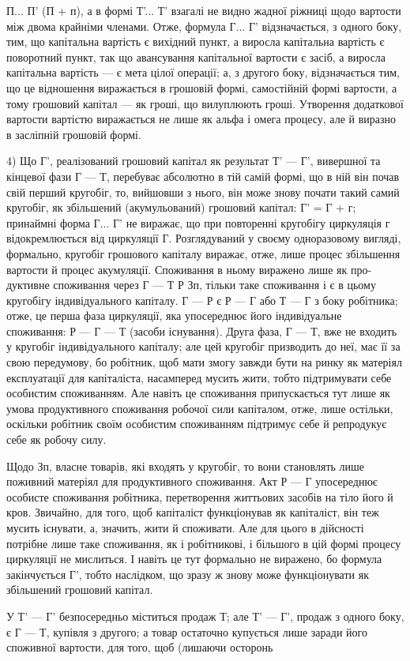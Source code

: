 \parcont{}  %
П... П' (П + п), а в формі Т'... Т' взагалі не видно жадної ріжниці щодо
вартости між двома крайніми членами. Отже, формула Г... Г’ відзначається,
з одного боку, тим, що капітальна вартість є вихідний пункт, а виросла
капітальна вартість є поворотний пункт, так що авансування
капітальної вартости є засіб, а виросла капітальна вартість — є мета
цілої операції; а, з другого боку, відзначається тим, що це відношення
виражається в грошовій формі, самостійній формі вартости, а тому грошовий
капітал — як гроші, що вилуплюють гроші. Утворення додаткової
вартости вартістю виражається не лише як альфа і омега процесу,
але й виразно в засліпній грошовій формі.

4) Що Г', реалізований грошовий капітал як результат Т' — Г', вивершної
та кінцевої фази Г — Т, перебуває абсолютно в тій самій формі, що в
ній він почав свій перший кругобіг, то, вийшовши з нього, він може
знову почати такий самий кругобіг, як збільшений (акумульований)
грошовий капітал: Г' = Г + г; принаймні форма Г... Г' не виражає, що
при повторенні кругобігу циркуляція г відокремлюється від циркуляції Г.
Розглядуваний у своєму одноразовому вигляді, формально, кругобіг
грошового капіталу виражає, отже, лише процес збільшення вартости й
процес акумуляції. Споживання в ньому виражено лише як про-дуктивне споживання через Г — Т  Р Зп,
тільки таке споживання
і є в цьому кругобігу індивідуального капіталу. Г — Р є Р — Г або Т — Г
з боку робітника; отже, це перша фаза циркуляції, яка упосереднює його
індивідуальне споживання: Р — Г — Т (засоби існування). Друга фаза, Г — Т,
вже не входить у кругобіг індивідуального капіталу; але цей кругобіг
призводить до неї, має її за свою передумову, бо робітник, щоб мати
змогу завжди бути на ринку як матеріял експлуатації для капіталіста,
насамперед мусить жити, тобто підтримувати себе особистим споживанням.
Але навіть це споживання припускається тут лише як умова продуктивного
споживання робочої сили капіталом, отже, лише остільки, оскільки
робітник своїм особистим споживанням підтримує себе й репродукує себе
як робочу силу.

Щодо Зп, власне товарів, які входять у кругобіг, то вони
становлять лише поживний матеріял для продуктивного споживання. Акт
Р — Г упосереднює особисте споживання робітника, перетворення життьових
засобів на тіло його й кров. Звичайно, для того, щоб капіталіст
функціонував як капіталіст, він теж мусить існувати, а, значить, жити й
споживати. Але для цього в дійсності потрібне лише таке споживання, як і
робітникові, і більшого в цій формі процесу циркуляції не мислиться.
І навіть це тут формально не виражено, бо формула закінчується Г',
тобто наслідком, що зразу ж знову може функціонувати як збільшений
грошовий капітал.

У Т' — Г' безпосередньо міститься продаж Т; але Т' — Г', продаж з
одного боку, є Г — Т, купівля з другого; а товар остаточно купується
лише заради його споживної вартости, для того, щоб (лишаючи осторонь
\parbreak{}  %
